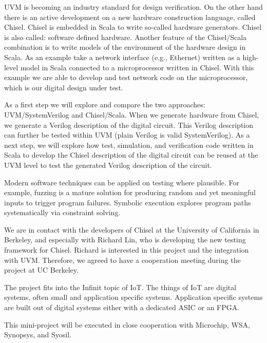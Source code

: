 \documentclass[fleqn,12pt]{article}
\begin{document}
UVM is becoming an industry standard for design verification. On the other hand there is an active development on a new hardware construction language, called Chisel. Chisel is embedded in Scala to write so-called hardware generators. Chisel is also called: software defined hardware. Another feature of the Chisel/Scala combination is to write models of the environment of the hardware design in Scala. As an example take a network interface (e.g., Ethernet) written as a high-level model in Scala connected to a microprocessor written in Chisel. With this example we are able to develop and test network code on the microprocessor, which is our digital design under test.



As a first step we will explore and compare the two approaches: UVM/SystemVerilog and Chisel/Scala. When we generate hardware from Chisel, we generate a Verilog description of the digital circuit. This Verilog description can further be tested within UVM (plain Verilog is valid SystemVerilog). As a next step, we will explore how test, simulation, and verification code written in Scala to develop the Chisel description of the digital circuit can be reused at the UVM level to test the generated Verilog description of the circuit.


Modern software techniques can be applied on testing where plausible. For example, fuzzing is a mature solution for producing random and yet meaningful inputs to trigger program failures. Symbolic execution explores program paths systematically via constraint solving.



We are in contact with the developers of Chisel at the University of California in Berkeley, and especially with Richard Lin, who is developing the new testing framework for Chisel. Richard is interested in this project and the integration with UVM. Therefore, we agreed to have a cooperation meeting during the project at UC Berkeley.



The project fits into the Infinit topic of IoT. The things of IoT are digital systems, often small and application specific systems. Application specific systems are built out of digital systems either with a dedicated ASIC or an FPGA.



This mini-project will be executed in close cooperation with Microchip, WSA, Synopsys, and Syosil. 
\end{document}

